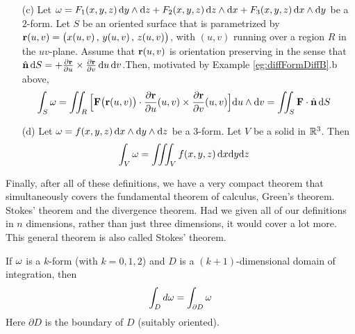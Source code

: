 \addtocounter{theorem}{-1}
\begin{defn}[continued]
\begin{enumerate}[(a)]


\item[(c)]
Let  $\omega = F_1(x,y,z)\,\mathrm{d}y\wedge\mathrm{d}z
 + F_2(x,y,z)\,\mathrm{d}z\wedge\mathrm{d}x
 + F_3(x,y,z)\,\mathrm{d}x\wedge\mathrm{d}y$   
be a  $2$-form. Let $S$ be an oriented surface that is parametrized 
by $\mathbf{r}(u,v) = \big(x(u,v)\,,\,y(u,v)\,,\,z(u,v)\big)$, 
with $(u,v)$ running over a region $R$ in the $uv$-plane. 
Assume that $\mathbf{r}(u,v)$ is orientation preserving in the sense that
$\hat{\mathbf{n}}\,\mathrm{d}S = +\frac{\partial \mathbf{r}}{\partial u}
\times \frac{\partial \mathbf{r}}{\partial v}\,\mathrm{d}u\,\mathrm{d}v$.Then,
motivated by Example \ref{eg:diffFormDiffB}.b above,
\begin{align*}
\int_{S}\omega &= \iint_R \Big[\mathbf{F}\big(\mathbf{r}(u,v)\big)\cdot 
           \frac{\partial\mathbf{r}}{\partial u}(u,v)
                 \times \frac{\partial\mathbf{r}}{\partial v}(u,v)\Big] 
         \mathrm{d}u\wedge\mathrm{d}v
           = \iint_S \mathbf{F}\cdot \hat{\mathbf{n}}\,\mathrm{d}S 
\end{align*}


\item[(d)]
Let  $\omega = f(x,y,z)\,\mathrm{d}x\wedge\mathrm{d}y\wedge\mathrm{d}z$   
be a  $3$-form. Let $V$ be a solid in $\mathbb{R}^3$. Then
\begin{align*}
\int_{V}\omega &= \iiint_V f(x,y,z)\,\mathrm{d}x\mathrm{d}y\mathrm{d}z
\end{align*}
\end{enumerate}
\end{defn}

Finally, after all of these definitions, we have a very compact
theorem that simultaneously covers the fundamental theorem of calculus, 
Green's theorem. Stokes' theorem and the divergence theorem. Had we given 
all of our definitions in $n$ dimensions, rather than just three dimensions,
it would cover a lot more. This general theorem is also called Stokes'
theorem.
\begin{theorem}\label{thm:GenStokes}
If $\omega$ is a $k$-form (with $k=0,1,2$) and $D$ is a $(k+1)$-dimensional
domain of integration, then
\begin{equation*}
\int_D d\omega=\int_{\partial D}\omega
\end{equation*}
Here $\partial D$ is the boundary of $D$ (suitably oriented).
\end{theorem}

